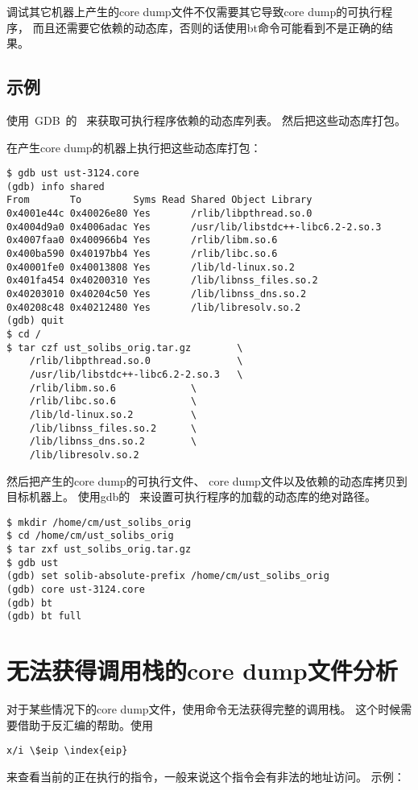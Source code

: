 调试其它机器上产生的core dump文件不仅需要其它导致core dump的可执行程序，
而且还需要它依赖的动态库，否则的话使用bt命令可能看到不是正确的结果。

\subsection{示例}

使用~GDB~的~
来获取可执行程序依赖的动态库列表。
然后把这些动态库打包。

在产生core dump的机器上执行把这些动态库打包：

\begin{lstlisting}
$ gdb ust ust-3124.core
(gdb) info shared
From       To         Syms Read Shared Object Library
0x4001e44c 0x40026e80 Yes       /rlib/libpthread.so.0
0x4004d9a0 0x4006adac Yes       /usr/lib/libstdc++-libc6.2-2.so.3
0x4007faa0 0x400966b4 Yes       /rlib/libm.so.6
0x400ba590 0x40197bb4 Yes       /rlib/libc.so.6
0x40001fe0 0x40013808 Yes       /lib/ld-linux.so.2
0x401fa454 0x40200310 Yes       /lib/libnss_files.so.2
0x40203010 0x40204c50 Yes       /lib/libnss_dns.so.2
0x40208c48 0x40212480 Yes       /lib/libresolv.so.2
(gdb) quit
$ cd /
$ tar czf ust_solibs_orig.tar.gz        \
    /rlib/libpthread.so.0               \
    /usr/lib/libstdc++-libc6.2-2.so.3   \
    /rlib/libm.so.6             \
    /rlib/libc.so.6             \
    /lib/ld-linux.so.2          \
    /lib/libnss_files.so.2      \
    /lib/libnss_dns.so.2        \
    /lib/libresolv.so.2
\end{lstlisting}

然后把产生的core dump的可执行文件、
core dump文件以及依赖的动态库拷贝到目标机器上。
使用gdb的~
来设置可执行程序的加载的动态库的绝对路径。


\begin{lstlisting}
$ mkdir /home/cm/ust_solibs_orig
$ cd /home/cm/ust_solibs_orig
$ tar zxf ust_solibs_orig.tar.gz
$ gdb ust
(gdb) set solib-absolute-prefix /home/cm/ust_solibs_orig
(gdb) core ust-3124.core
(gdb) bt
(gdb) bt full
\end{lstlisting}

\section{无法获得调用栈的core dump文件分析}

对于某些情况下的core dump文件，使用\code{bt}命令无法获得完整的调用栈。
这个时候需要借助于反汇编的帮助。使用 \\
\begin{lstlisting}
x/i \$eip \index{eip}
\end{lstlisting}
来查看当前的正在执行的指令，一般来说这个指令会有非法的地址访问。
示例：

